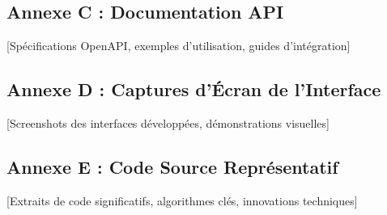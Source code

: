 \documentclass[a4paper,12pt]{article}
\begin{document}
\subsection{Annexe C : Documentation API}
[Spécifications OpenAPI, exemples d'utilisation, guides d'intégration]

\subsection{Annexe D : Captures d'Écran de l'Interface}
[Screenshots des interfaces développées, démonstrations visuelles]

\subsection{Annexe E : Code Source Représentatif}
[Extraits de code significatifs, algorithmes clés, innovations techniques]
\end{document}
